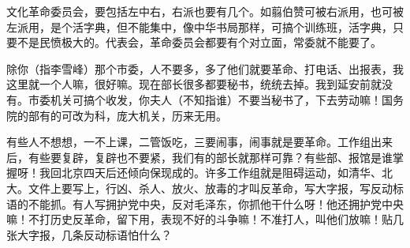 文化革命委员会，要包括左中右，右派也要有几个。如翦伯赞可被右派用，也可被左派用，是个活字典，但不能集中，像中华书局那样，可搞个训练班，活字典，只要不是民愤极大的。代表会，革命委员会都要有个对立面，常委就不能要了。

除你（指李雪峰）那个市委，人不要多，多了他们就要革命、打电话、出报表，我这里就一个人嘛，很好嘛。现在部长很多都要秘书，统统去掉。我到延安前就没有。市委机关可搞个收发，你夫人（不知指谁）不要当秘书了，下去劳动嘛！国务院的部有的可改为科，庞大机关，历来无用。

有些人不想想，一不上课，二管饭吃，三要闹事，闹事就是要革命。工作组出来后，有些要复辟，复辟也不要紧，我们有的部长就那样可靠？有些部、报馆是谁掌握呀！我回北京四天后还倾向保现成的。许多工作组就是阻碍运动，如清华、北大。文件上要写上，行凶、杀人、放火、放毒的才叫反革命，写大字报，写反动标语的不能抓。有人写拥护党中央，反对毛泽东，你抓他干什么呀！他还拥护党中央嘛！不打历史反革命，留下用，表现不好的斗争嘛！不准打人，叫他们放嘛！贴几张大字报，几条反动标语怕什么？

